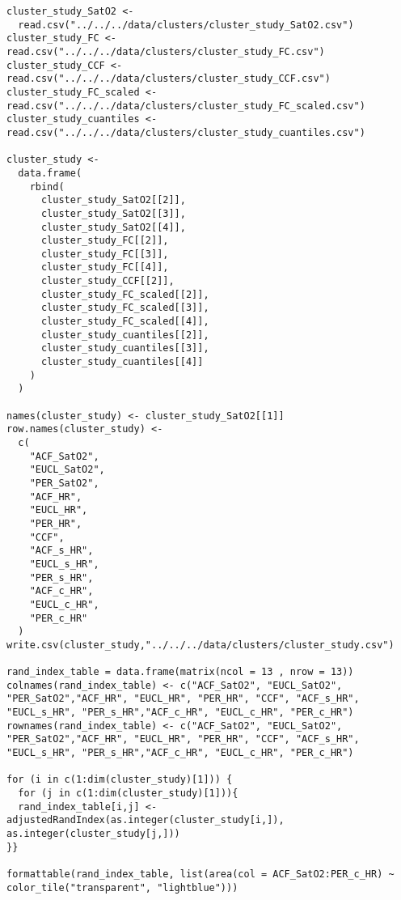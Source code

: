 \begin{lstlisting}[style=mystyle,caption={Adjusted Rand Index}, label={lst:input-gower-fun-preprocesamiento}]
    cluster_study_SatO2 <-
  read.csv("../../../data/clusters/cluster_study_SatO2.csv")
cluster_study_FC <- read.csv("../../../data/clusters/cluster_study_FC.csv")
cluster_study_CCF <- read.csv("../../../data/clusters/cluster_study_CCF.csv")
cluster_study_FC_scaled <- read.csv("../../../data/clusters/cluster_study_FC_scaled.csv")
cluster_study_cuantiles <- read.csv("../../../data/clusters/cluster_study_cuantiles.csv")

cluster_study <-
  data.frame(
    rbind(
      cluster_study_SatO2[[2]],
      cluster_study_SatO2[[3]],
      cluster_study_SatO2[[4]],
      cluster_study_FC[[2]],
      cluster_study_FC[[3]],
      cluster_study_FC[[4]],
      cluster_study_CCF[[2]],
      cluster_study_FC_scaled[[2]],
      cluster_study_FC_scaled[[3]],
      cluster_study_FC_scaled[[4]],
      cluster_study_cuantiles[[2]],
      cluster_study_cuantiles[[3]],
      cluster_study_cuantiles[[4]]
    )
  )

names(cluster_study) <- cluster_study_SatO2[[1]]
row.names(cluster_study) <-
  c(
    "ACF_SatO2",
    "EUCL_SatO2",
    "PER_SatO2",
    "ACF_HR",
    "EUCL_HR",
    "PER_HR",
    "CCF",
    "ACF_s_HR",
    "EUCL_s_HR",
    "PER_s_HR",
    "ACF_c_HR",
    "EUCL_c_HR",
    "PER_c_HR"
  )
write.csv(cluster_study,"../../../data/clusters/cluster_study.csv")

rand_index_table = data.frame(matrix(ncol = 13 , nrow = 13))
colnames(rand_index_table) <- c("ACF_SatO2", "EUCL_SatO2", "PER_SatO2","ACF_HR", "EUCL_HR", "PER_HR", "CCF", "ACF_s_HR", "EUCL_s_HR", "PER_s_HR","ACF_c_HR", "EUCL_c_HR", "PER_c_HR")
rownames(rand_index_table) <- c("ACF_SatO2", "EUCL_SatO2", "PER_SatO2","ACF_HR", "EUCL_HR", "PER_HR", "CCF", "ACF_s_HR", "EUCL_s_HR", "PER_s_HR","ACF_c_HR", "EUCL_c_HR", "PER_c_HR")

for (i in c(1:dim(cluster_study)[1])) {
  for (j in c(1:dim(cluster_study)[1])){
  rand_index_table[i,j] <- adjustedRandIndex(as.integer(cluster_study[i,]), as.integer(cluster_study[j,]))
}}

formattable(rand_index_table, list(area(col = ACF_SatO2:PER_c_HR) ~ color_tile("transparent", "lightblue")))
  \end{lstlisting}